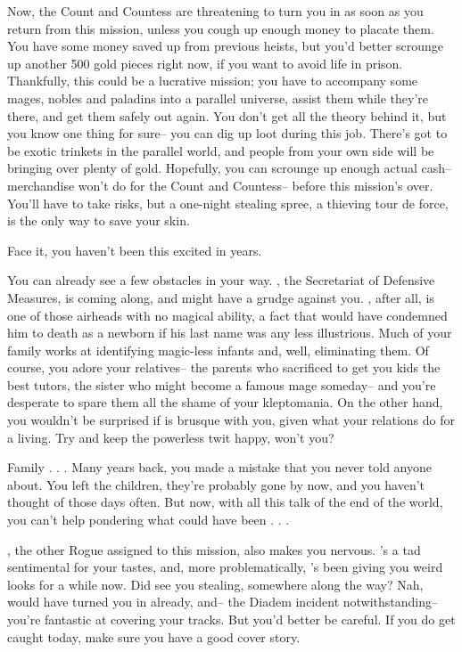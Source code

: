 \documentclass[char]{guildcamp3}
\begin{document}
Now, the Count and Countess are threatening to turn you in as soon as you return from this mission, unless you cough up enough money to placate them. You have some money saved up from previous heists, but you'd better scrounge up another 500 gold pieces right now, if you want to avoid life in prison. Thankfully, this could be a lucrative mission; you have to accompany some mages, nobles and paladins into a parallel universe, assist them while they're there, and get them safely out again. You don't get all the theory behind it, but you know one thing for sure-- you can dig up loot during this job. There's got to be exotic trinkets in the parallel world, and people from your own side will be bringing over plenty of gold. Hopefully, you can scrounge up enough actual cash-- merchandise won't do for the Count and Countess-- before this mission's over. You'll have to take risks, but a one-night stealing spree, a thieving tour de force, is the only way to save your skin.

Face it, you haven't been this excited in years.

You can already see a few obstacles in your way. \cNobleOne{}, the Secretariat of Defensive Measures, is coming along, and \cNobleOne{\they} might have a grudge against you.  \cNobleOne{\they}, after all, is one of those airheads with no magical ability, a fact that would have condemned him to death as a newborn if his last name was any less illustrious. Much of your family works at identifying magic-less infants and, well, eliminating them. Of course, you adore your relatives-- the parents who sacrificed to get you kids the best tutors, the sister who might become a famous mage someday-- and you're desperate to spare them all the shame of your kleptomania. On the other hand, you wouldn't be surprised if \cNobleOne{} is brusque with you, given what your relations do for a living. Try and keep the powerless twit happy, won't you? 

Family . . . Many years back, you made a mistake that you never told anyone about. You left the children, they're probably gone by now, and you haven't thought of those days often. But now, with all this talk of the end of the world, you can't help pondering what could have been . . .

\cRogueOne{}, the other Rogue assigned to this mission, also makes you nervous. \cRogueOne{\they}'s a tad sentimental for your tastes, and, more problematically, \cRogueOne{\they}'s been giving you weird looks for a while now. Did \cRogueOne{\they} see you stealing, somewhere along the way? Nah, \cRogueOne{\they} would have turned you in already, and-- the Diadem incident notwithstanding-- you're fantastic at covering your tracks. But you'd better be careful. If you do get caught today, make sure you have a good cover story.
\end{document}
